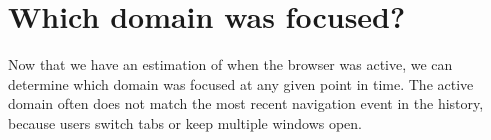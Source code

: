 \documentclass{sigchi}
\begin{document}







\section{Which domain was focused?}

Now that we have an estimation of when the browser was active, we can determine which domain was focused at any given point in time. The active domain often does not match the most recent navigation event in the history, because users switch tabs or keep multiple windows open.
\end{document}

